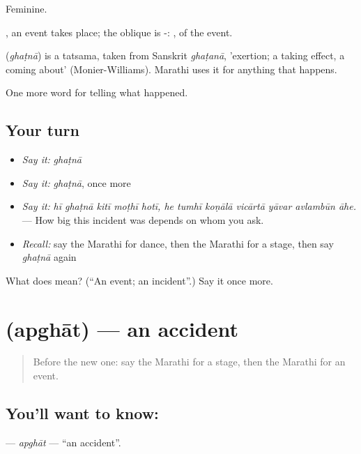 Feminine.

 , an event takes place; the oblique is -: , of the event.

\begin{cousinweb}
\textbf{} (\emph{ghaṭnā}) is a tatsama, taken from Sanskrit \emph{ghaṭanā}, 'exertion; a taking effect, a coming about' (Monier-Williams). Marathi uses it for anything that happens.
\end{cousinweb}

\begin{grammarlens}[title={What you've built}]
One more word for telling what happened.
\end{grammarlens}

\subsection*{Your turn}
\begin{itemize}
\raggedright
  \item \emph{Say it:} \emph{ghaṭnā}
  \item \emph{Say it:} \emph{ghaṭnā}, once more
  \item \emph{Say it:} \emph{hī ghaṭnā kitī moṭhī hotī, he tumhī koṇālā vicārtā yāvar avlambūn āhe.} — How big this incident was depends on whom you ask.
  \item \emph{Recall:} say the Marathi for dance, then the Marathi for a stage, then say \emph{ghaṭnā} again
\end{itemize}

\begin{tcolorbox}[breakable,colback=teal!4,colframe=teal!35!black,title={Before you move on}]
What does  mean? (\textquotedblleft{}An event; an incident\textquotedblright{}.) Say it once more.
\end{tcolorbox}
\section[\texorpdfstring{\mr{अपघात} (apghāt)}{अपघात (apghāt)}]{ (apghāt) — an accident}

\label{lesson:MR-C288-apghat}



\begin{quote}
Before the new one: say the Marathi for a stage, then the Marathi for an event.
\end{quote}

\subsection*{You'll want to know: }
\textbf{} — \emph{apghāt} — \textquotedblleft{}an accident\textquotedblright{}.

